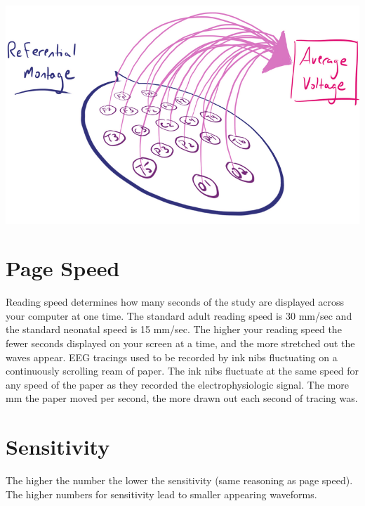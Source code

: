 \documentclass[12pt]{article}
\begin{document}
\includegraphics[scale=0.4]{ReferentialMontage}

\section{Page Speed} 
Reading speed determines how many seconds of the study are displayed across your computer at one time. 
The standard adult reading speed is 30 mm/sec and the standard neonatal speed is 15 mm/sec.
The higher your reading speed the fewer seconds displayed on your screen at a time, and the more stretched out the waves appear.
EEG tracings used to be recorded by ink nibs fluctuating on a continuously scrolling ream of paper. 
The ink nibs fluctuate at the same speed for any speed of the paper as they recorded the electrophysiologic signal.
The more mm the paper moved per second, the more drawn out each second of tracing was.

\section{Sensitivity} 
The higher the number the lower the sensitivity (same reasoning as page speed).
The higher numbers for sensitivity lead to smaller appearing waveforms.
\end{document}
